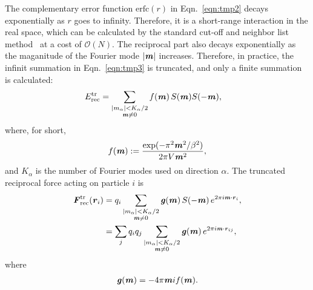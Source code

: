 \documentclass[aps,pre,preprint]{revtex4}
\renewcommand{\v}[1]{\textbf{\textit{#1}}}
\begin{document}
The complementary error function $\textrm{erfc}(r)$ in
Eqn.~\eqref{eqn:tmp2} decays exponentially as $r$ goes to infinity.
Therefore, it is a short-range interaction in the real space, which
can be calculated by the standard cut-off and neighbor list
method~\cite{frenkel02b} at a cost of $\mathcal O(N)$.  The reciprocal
part also decays exponentially as the maganitude of the Fourier mode
$\vert\v m\vert$ increases. Therefore, in practice, the infinit
summation in Eqn.~\eqref{eqn:tmp3} is truncated, and only a finite
summation is calculated:
\begin{align}\label{eqn:tmp6}
  E^{\textrm{tr}}_{\textrm{rec}} & =
  \sum_{
    \begin{subarray}{c}
      \vert m_\alpha\vert < K_\alpha/2\\
      \v m\neq 0
    \end{subarray}}
  f(\v m)\, S(\v m) S(-\v m),
\end{align}
where, for short,
\begin{align}
  f(\v m) := \frac{\exp(-\pi^2 \v m^2 / \beta^2)}{2\pi V \v m^2},
\end{align}
and $K_\alpha$ is the number of Fourier modes used on direction
$\alpha$.  The truncated reciprocal force acting on particle $i$ is
\begin{align}\nonumber
  \v F^{\textrm{tr}}_{\textrm{rec}}(\v r_i)
  &= 
  q_i 
  \sum_{
    \begin{subarray}{c}
      \vert m_\alpha\vert < K_\alpha/2\\
      \v m\neq 0
    \end{subarray}}
  \v g(\v m) \,
  S(-\v m)\,
  e^{2\pi i\v m\cdot\v r_i}, \\\label{eqn:tmp8}
  &= 
  \sum_j   q_iq_j
  \sum_{
    \begin{subarray}{c}
      \vert m_\alpha\vert < K_\alpha/2\\
      \v m\neq 0
    \end{subarray}}
  \v g(\v m) \,
  e^{2\pi i\v m\cdot\v r_{ij}},
\end{align}
where
\begin{align}
  \v g(\v m) = -4 \pi \v m i f(\v m).
\end{align}


\end{document}

